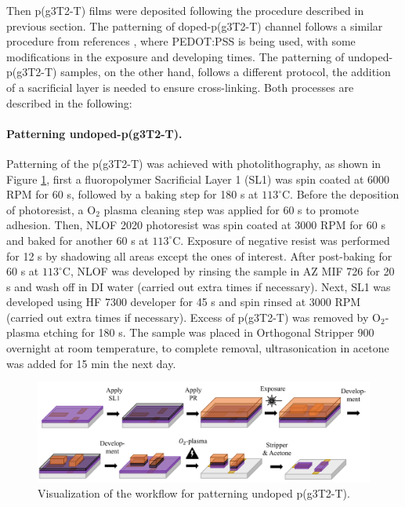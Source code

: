Then p(g3T2-T) films were deposited following the procedure described in previous section. The patterning of doped-p(g3T2-T) channel follows a similar procedure from references \cite{weissbachPhotopatternableSolidElectrolyte2022}\cite{bongartzOrganicElectrochemicalTransistors2021}, where PEDOT:PSS is being used, with some modifications in the exposure and developing times. The patterning of undoped-p(g3T2-T) samples, on the other hand, follows a different protocol, the addition of a sacrificial layer is needed to ensure cross-linking. Both processes are described in the following:

\paragraph{Patterning undoped-p(g3T2-T).}Patterning of the p(g3T2-T) was achieved with photolithography, as shown in Figure \ref{fig:undopedpat}, first a fluoropolymer Sacrificial Layer 1 (SL1) was spin coated at 6000 RPM for 60 s, followed by a baking step for 180 s at $113^{\circ}$C. Before the deposition of photoresist, a O$_{2}$ plasma cleaning step was applied for 60 s to promote adhesion. Then, NLOF 2020 photoresist was spin coated at 3000 RPM for 60 s and baked for another 60 s at $113^{\circ}$C. Exposure of negative resist was performed for 12 s by shadowing all areas except the ones of interest. After post-baking for 60 s at $113^{\circ}$C, NLOF was developed by rinsing the sample in AZ MIF 726 for 20 s and wash off in DI water (carried out extra times if necessary). Next, SL1 was developed using HF 7300 developer for 45 s and spin rinsed at 3000 RPM (carried out extra times if necessary). Excess of p(g3T2-T) was removed by O$_{2}$-plasma etching for 180 s. The sample was placed in Orthogonal Stripper 900 overnight at room temperature, to complete removal, ultrasonication in acetone was added for 15 min the next day. 

\begin{figure}[ht]
	\centering
	\includegraphics[width=12cm]{Images/pdf/undoped-patterning.pdf}
	\caption{Visualization of the workflow for patterning undoped p(g3T2-T).}
	\label{fig:undopedpat}
\end{figure}

